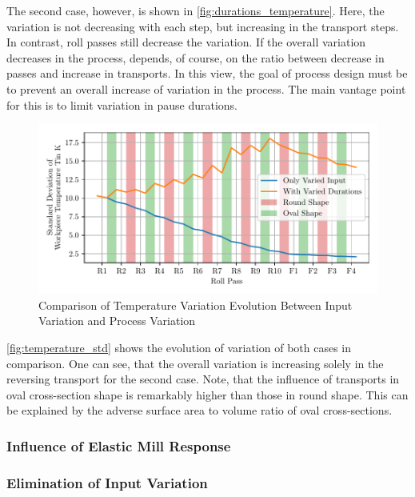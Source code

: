 The second case, however, is shown in \autoref{fig:durations_temperature}.
Here, the variation is not decreasing with each step, but increasing in the transport steps.
In contrast, roll passes still decrease the variation.
If the overall variation decreases in the process, depends, of course, on the ratio between decrease in passes and increase in transports.
In this view, the goal of process design must be to prevent an overall increase of variation in the process.
The main vantage point for this is to limit variation in pause durations.

\begin{figure}
    \centering
    \includegraphics{img/temperature_std}
    \caption{Comparison of Temperature Variation Evolution Between Input Variation and Process Variation}
    \label{fig:temperature_std}
\end{figure}

\autoref{fig:temperature_std} shows the evolution of variation of both cases in comparison.
One can see, that the overall variation is increasing solely in the reversing transport for the second case.
Note, that the influence of transports in oval cross-section shape is remarkably higher than those in round shape.
This can be explained by the adverse surface area to volume ratio of oval cross-sections.



\subsubsection{Influence of Elastic Mill Response}\label{subsubsec:influence-of-elastic-mill-response}

\subsubsection{Elimination of Input Variation}\label{subsubsec:elimination-of-input-variation}

